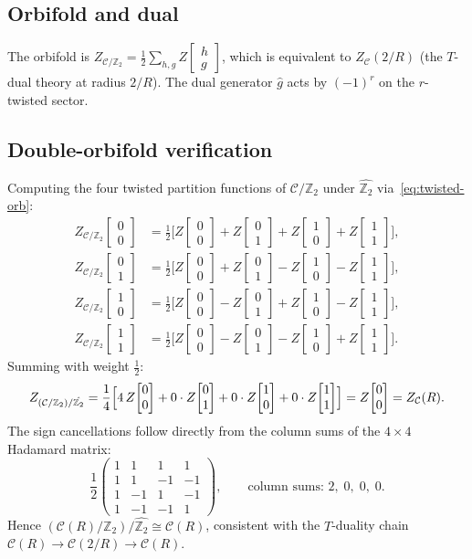 \documentclass[11pt,a4paper]{article}
\theoremstyle{plain}
\theoremstyle{definition}
\theoremstyle{remark}
\newcommand{\Ztwo}{\mathbb{Z}_2}
\newcommand{\Cft}{\mathcal{C}}
\newcommand{\partfn}[2]{Z\!\begin{bmatrix}#1\\#2\end{bmatrix}}
\begin{document}
\subsection{Orbifold and dual}

The orbifold is $Z_{\Cft/\Ztwo} = \frac{1}{2}\sum_{h,g}\partfn{h}{g}$,
which is equivalent to $Z_{\Cft}(2/R)$ (the $T$-dual theory at radius
$2/R$).  The dual generator $\hat{g}$ acts by $(-1)^r$ on the $r$-twisted
sector.

\subsection{Double-orbifold verification}

Computing the four twisted partition functions of $\Cft/\Ztwo$ under
$\hat{\Ztwo}$ via~\eqref{eq:twisted-orb}:
\begin{align*}
  Z_{\Cft/\Ztwo}\!\begin{bmatrix}0\\0\end{bmatrix}
  &= \tfrac{1}{2}\bigl[\partfn{0}{0}+\partfn{0}{1}+\partfn{1}{0}+\partfn{1}{1}\bigr],\\
  Z_{\Cft/\Ztwo}\!\begin{bmatrix}0\\1\end{bmatrix}
  &= \tfrac{1}{2}\bigl[\partfn{0}{0}+\partfn{0}{1}-\partfn{1}{0}-\partfn{1}{1}\bigr],\\
  Z_{\Cft/\Ztwo}\!\begin{bmatrix}1\\0\end{bmatrix}
  &= \tfrac{1}{2}\bigl[\partfn{0}{0}-\partfn{0}{1}+\partfn{1}{0}-\partfn{1}{1}\bigr],\\
  Z_{\Cft/\Ztwo}\!\begin{bmatrix}1\\1\end{bmatrix}
  &= \tfrac{1}{2}\bigl[\partfn{0}{0}-\partfn{0}{1}-\partfn{1}{0}+\partfn{1}{1}\bigr].
\end{align*}
Summing with weight $\frac{1}{2}$:
\[
  Z_{(\Cft/\Ztwo)/\hat{\Ztwo}}
  = \frac{1}{4}\Bigl[
    4\,\partfn{0}{0}
    + 0\cdot\partfn{0}{1}
    + 0\cdot\partfn{1}{0}
    + 0\cdot\partfn{1}{1}
  \Bigr]
  = \partfn{0}{0} = Z_{\Cft}(R).
\]
The sign cancellations follow directly from the column sums of the
$4\times 4$ Hadamard matrix:
\begin{equation}\label{eq:hadamard}
  \frac{1}{2}\begin{pmatrix}1&1&1&1\\1&1&-1&-1\\1&-1&1&-1\\1&-1&-1&1\end{pmatrix},
  \qquad
  \text{column sums: }2,\;0,\;0,\;0.
\end{equation}
Hence $(\Cft(R)/\Ztwo)/\hat{\Ztwo} \cong \Cft(R)$, consistent with
the $T$-duality chain $\Cft(R)\to\Cft(2/R)\to\Cft(R)$.
\end{document}
